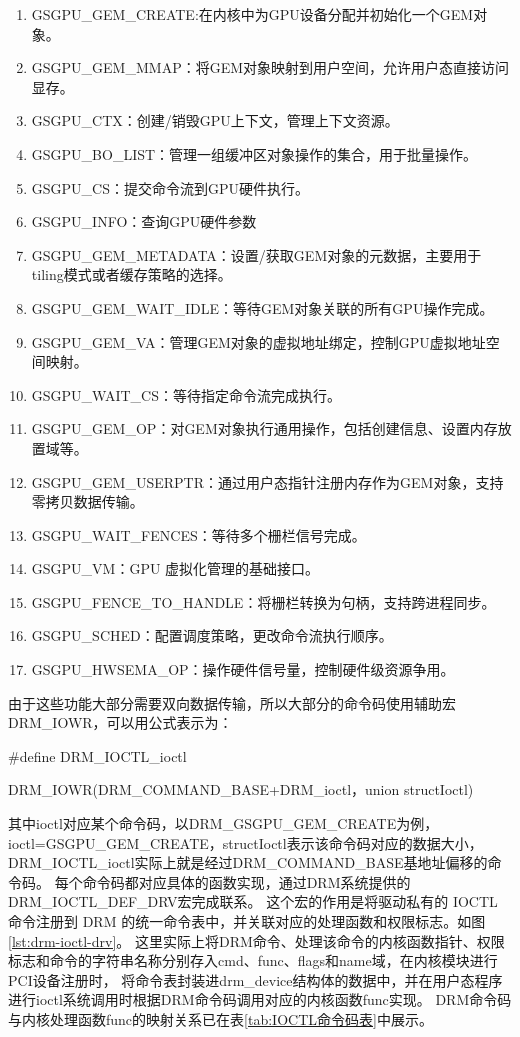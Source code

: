 \begin{enumerate}[label=\arabic*.]
  \item GSGPU\_GEM\_CREATE:在内核中为GPU设备分配并初始化一个GEM对象。
  \item GSGPU\_GEM\_MMAP：将GEM对象映射到用户空间，允许用户态直接访问显存。
  \item GSGPU\_CTX：创建/销毁GPU上下文，管理上下文资源。
  \item GSGPU\_BO\_LIST：管理一组缓冲区对象操作的集合，用于批量操作。
  \item GSGPU\_CS：提交命令流到GPU硬件执行。
  \item GSGPU\_INFO：查询GPU硬件参数
  \item GSGPU\_GEM\_METADATA：设置/获取GEM对象的元数据，主要用于tiling模式或者缓存策略的选择。
  \item GSGPU\_GEM\_WAIT\_IDLE：等待GEM对象关联的所有GPU操作完成。
  \item GSGPU\_GEM\_VA：管理GEM对象的虚拟地址绑定，控制GPU虚拟地址空间映射。
  \item GSGPU\_WAIT\_CS：等待指定命令流完成执行。
  \item GSGPU\_GEM\_OP：对GEM对象执行通用操作，包括创建信息、设置内存放置域等。
  \item GSGPU\_GEM\_USERPTR：通过用户态指针注册内存作为GEM对象，支持零拷贝数据传输。
  \item GSGPU\_WAIT\_FENCES：等待多个栅栏信号完成。
  \item GSGPU\_VM：GPU 虚拟化管理的基础接口。
  \item GSGPU\_FENCE\_TO\_HANDLE：将栅栏转换为句柄，支持跨进程同步。
  \item GSGPU\_SCHED：配置调度策略，更改命令流执行顺序。
  \item GSGPU\_HWSEMA\_OP：操作硬件信号量，控制硬件级资源争用。
\end{enumerate}

由于这些功能大部分需要双向数据传输，所以大部分的命令码使用辅助宏DRM\_IOWR，可以用公式表示为：

\#define DRM\_IOCTL\_ioctl

 DRM\_IOWR(DRM\_COMMAND\_BASE+DRM\_ioctl，union structIoctl)

其中ioctl对应某个命令码，以DRM\_GSGPU\_GEM\_CREATE为例，ioctl=GSGPU\_GEM\_CREATE，structIoctl表示该命令码对应的数据大小，
DRM\_IOCTL\_ioctl实际上就是经过DRM\_COMMAND\_BASE基地址偏移的命令码。
每个命令码都对应具体的函数实现，通过DRM系统提供的DRM\_IOCTL\_DEF\_DRV宏完成联系。
这个宏的作用是将驱动私有的 IOCTL 命令注册到 DRM 的统一命令表中，并关联对应的处理函数和权限标志。如图\ref{lst:drm-ioctl-drv}。
这里实际上将DRM命令、处理该命令的内核函数指针、权限标志和命令的字符串名称分别存入cmd、func、flags和name域，在内核模块进行PCI设备注册时，
将命令表封装进drm\_device结构体的数据中，并在用户态程序进行ioctl系统调用时根据DRM命令码调用对应的内核函数func实现。
DRM命令码与内核处理函数func的映射关系已在表\ref{tab:IOCTL命令码表}中展示。

